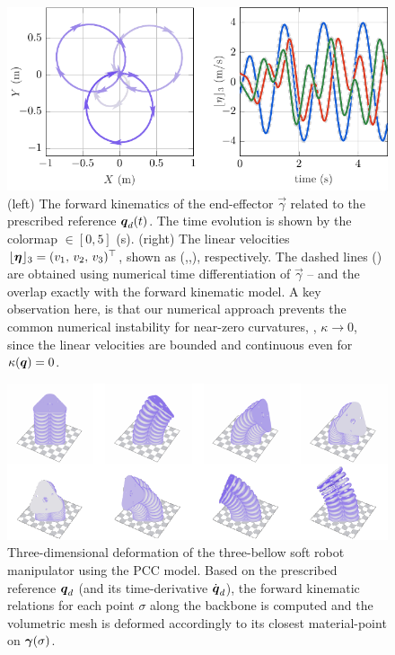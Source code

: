  \begin{figure}[!h]
  \pgfplotsset{colormap name=barney}
  \includegraphics*{./pdf/thesis-figure-4-5.pdf}
  \caption{(left) The forward kinematics of the end-effector $\vec{\gamma}$ related to the prescribed reference ${\boldsymbol{q}}_d(t)$. The time evolution is shown by the colormap \protect{}$\!\!\in [0,5]$ (s). (right) The linear velocities $\lfloor{\boldsymbol{\eta}}\rfloor_3 = (v_1,\,v_2,\,v_3)^\top$, shown as (,,), respectively. The dashed lines () are obtained using numerical time differentiation of $\vec{\gamma}$ -- and the overlap exactly with the forward kinematic model. A key observation here, is that our numerical approach prevents the common numerical instability for near-zero curvatures, \ie, $\kappa \to 0$, since the linear velocities are bounded and continuous even for $\kappa({\boldsymbol{q}}) = 0$. }
  \label{fig:C2:EX1:strain_ref_FK}
\end{figure}
\vfill

\begin{figure}[!h]
   \centering
   \includegraphics[width=.95\textwidth]{./pdf/thesis-figure-4-4.pdf}
   \caption{Three-dimensional deformation of the three-bellow soft robot manipulator using the PCC model. Based on the prescribed reference ${\boldsymbol{q}}_d$ (and its time-derivative ${\dot{\boldsymbol{q}}}_d$), the forward kinematic relations for each point $\sigma$ along the backbone is computed and the volumetric mesh is deformed accordingly to its closest material-point on ${\boldsymbol{\gamma}}(\sigma)$.}
   \vspace{-0.1cm}
   \label{fig:C2:EX1:strain_ref_3D}
 \end{figure}

